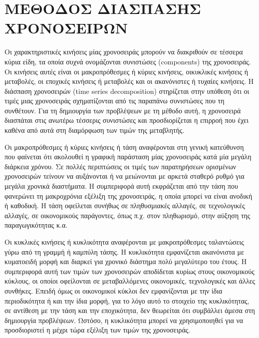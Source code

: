 \section{ΜΕΘΟΔΟΣ ΔΙΑΣΠΑΣΗΣ ΧΡΟΝΟΣΕΙΡΩΝ}
Οι χαρακτηριστικές κινήσεις μίας χρονοσειράς μπορούν να διακριθούν σε
τέσσερα κύρια είδη, τα οποία συχνά ονομάζονται συνιστώσες (components) της
χρονοσειράς. Οι κινήσεις αυτές είναι οι μακροπρόθεσμες ή κύριες κινήσεις, οικυκλικές κινήσεις ή μεταβολές, οι εποχικές κινήσεις ή μεταβολές και οι ακανόνιστες
ή τυχαίες κινήσεις. Η διάσπαση χρονοσειρών (time series decomposition) στηρίζεται
στην υπόθεση ότι οι τιμές μιας χρονοσειράς σχηματίζονται από τις παραπάνω
συνιστώσες που τη συνθέτουν. Για τη δημιουργία των προβλέψεων με τη μέθοδο
αυτή, η χρονοσειρά διασπάται στις ανωτέρω τέσσερις συνιστώσες και προσδιορίζεται
η επιρροή που έχει καθένα από αυτά στη διαμόρφωση των τιμών της μεταβλητής.

Οι μακροπρόθεσμες ή κύριες κινήσεις ή τάση αναφέρονται στη γενική
κατεύθυνση που φαίνεται ότι ακολουθεί η γραφική παράσταση μίας χρονοσειράς
κατά μία μεγάλη διάρκεια χρόνου. Σε πολλές περιπτώσεις οι τιμές των
παρατηρήσεων ορισμένων χρονοσειρών τείνουν να αυξάνονται ή να μειώνονται με
αρκετά σταθερό ρυθμό για μεγάλα χρονικά διαστήματα. Η συμπεριφορά αυτή
εκφράζεται από την τάση που φανερώνει τη μακροχρόνια εξέλιξη της χρονοσειράς, η
οποία μπορεί να είναι ανοδική ή καθοδική. Η τάση οφείλεται συνήθως σε
πληθυσμιακές αλλαγές, σε τεχνολογικές αλλαγές, σε οικονομικούς παράγοντες, όπως
π.χ. στον πληθωρισμό, στην αύξηση της παραγωγικότητας κ.α.

Οι κυκλικές κινήσεις ή κυκλικότητα αναφέρονται με μακροπρόθεσμες
ταλαντώσεις γύρω από τη γραμμή ή καμπύλη τάσης. Η κυκλικότητα εμφανίζεται
ακανόνιστα με κυματοειδή μορφή και διαρκεί για χρονικό διάστημα πολύ μεγαλύτερο
του έτους. Η συμπεριφορά αυτή των τιμών των χρονοσειρών αποδίδεται κυρίως
στους οικονομικούς κύκλους, οι οποίοι οφείλονται σε μεταβαλλόμενες οικονομικές,
τεχνολογικές και άλλες συνθήκες. Επειδή όμως οι οικονομικοί κύκλοι δεν
εμφανίζονται με την ίδια περιοδικότητα ή και την ίδια μορφή, για το λόγο αυτό το
στοιχείο της κυκλικότητας, σε αντίθεση με την τάση και την εποχικότητα, δεν
θεωρείται ότι συμβάλλει άμεσα στη δημιουργία προβλέψεων. Ωστόσο, η κυκλικότητα
μπορεί να χρησιμοποιηθεί για να προσδιοριστεί η μέχρι τώρα εξέλιξη των τιμών της
χρονοσειράς.

